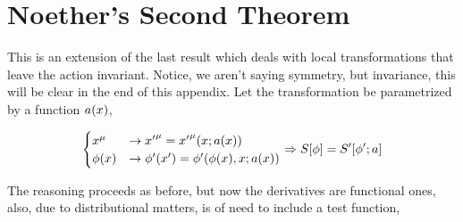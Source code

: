 \section{Noether's Second Theorem}

This is an extension of the last result which deals with local transformations that leave the action 
invariant. Notice, we aren't saying symmetry, but invariance, this will be clear in the end of this 
appendix. Let the transformation be parametrized by a function $a\qty(x)$,

\begin{align}
    \begin{cases}
        x^\mu&\rightarrow {x'}^\mu = {x'}^\mu\qty(x;a(x))\\
        \phi\qty(x)&\rightarrow {\phi'}\qty(x')={\phi'}\qty(\phi\qty(x),x;a(x))
    \end{cases}\Rightarrow S\qty[\phi] = S'\qty[{\phi'};a]
\end{align}

The reasoning proceeds as before, but now the derivatives are functional ones, also, due to 
distributional matters, is of need to include a test function,

